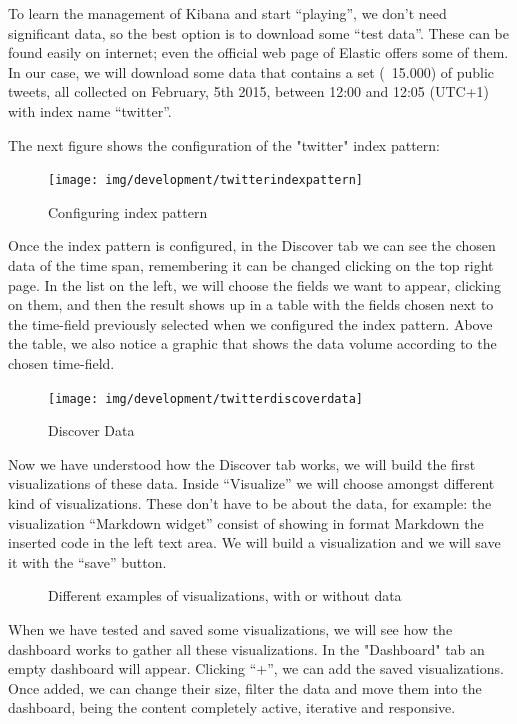 \documentclass[a4paper, 12pt]{book}
\begin{document}
To learn the management of Kibana and start “playing”, we don’t need significant data, so the best option is to download some “test data”. These can be found easily on internet; even the official web page of Elastic offers some of them. In our case, we will download some data that contains a set (~15.000) of public tweets, all collected on February, 5th 2015, between 12:00 and 12:05 (UTC+1) with index name “twitter”.

The next figure shows the configuration of the "twitter" index pattern:

\begin{figure}[H]
  \centering
  \texttt{[image: img/development/twitterindexpattern]}
  \caption{Configuring index pattern}
  \label{fig:twitterindexpattern}
\end{figure}

Once the index pattern is configured, in the Discover tab we can see the chosen data of the time span, remembering it can be changed clicking on the top right page. In the list on the left, we will choose the fields we want to appear, clicking on them, and then the result shows up in a table with the fields chosen next to the time-field previously selected when we configured the index pattern. Above the table, we also notice a graphic that shows the data volume according to the chosen time-field.

\begin{figure}[H]
  \centering
  \texttt{[image: img/development/twitterdiscoverdata]}
  \caption{Discover Data}
  \label{fig:twitterdiscoverdata}
\end{figure}


Now we have understood how the Discover tab works, we will build the first visualizations of these data. Inside “Visualize” we will choose amongst different kind of visualizations. These don’t have to be about the data, for example: the visualization “Markdown widget” consist of showing in format Markdown the inserted code in the left text area. We will build a visualization and we will save it with the “save” button.

\begin{figure}[H]
 \centering
 \caption{Different examples of visualizations, with or without data}
 \label{f:fc2}
\end{figure}


When we have tested and saved some visualizations, we will see how the dashboard works to gather all these visualizations. In the "Dashboard" tab an empty dashboard will appear. Clicking “+”, we can add the saved visualizations. Once added, we can change their size, filter the data and move them into the dashboard, being the content completely active, iterative and responsive.
\end{document}
